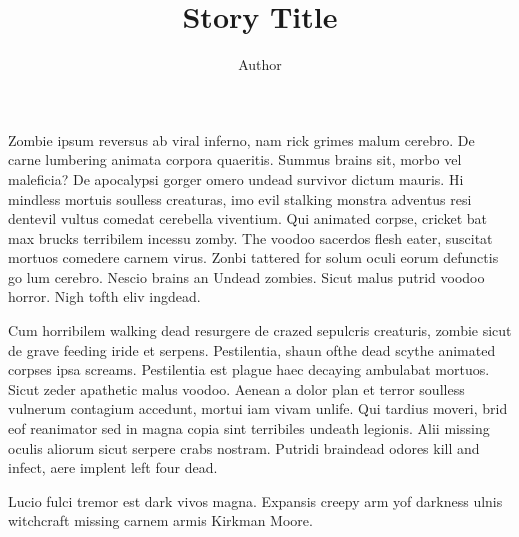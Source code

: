 \documentclass[ebook,11pt,oneside,openany]{memoir}
\begin{document}
\title{Story Title}
\author{Author}
\date{}
\maketitle

\begin{comment}
-------------------------
----------Plot-----------
-------------------------
Insert section plot from 1-plot.text here
-Section 1-
Max X words

----AIM----




--Details--




-------------------------
------Senses Check-------
-------------------------
Smell
Touch
Sound
Taste
Sight

-------------------------
------Other Checks-------
-------------------------
Checked adverb use? (0)
Checked cliche use? (0)
Checked tense integrity?
Checked perspective integrity?
Checked reuse of major words?
Checked sentence length?
Checked simile use? (<=5)
Checked metaphor use? (<=3)
Checked description length?
Checked paragraph density

Zombie Ipsum text from here: http://www.zombieipsum.com/
\end{comment}


Zombie ipsum reversus ab viral inferno, nam rick grimes malum cerebro. De carne lumbering animata corpora quaeritis. Summus brains sit​​, morbo vel maleficia? De apocalypsi gorger omero undead survivor dictum mauris. Hi mindless mortuis soulless creaturas, imo evil stalking monstra adventus resi dentevil vultus comedat cerebella viventium. Qui animated corpse, cricket bat max brucks terribilem incessu zomby. The voodoo sacerdos flesh eater, suscitat mortuos comedere carnem virus. Zonbi tattered for solum oculi eorum defunctis go lum cerebro. Nescio brains an Undead zombies. Sicut malus putrid voodoo horror. Nigh tofth eliv ingdead.

Cum horribilem walking dead resurgere de crazed sepulcris creaturis, zombie sicut de grave feeding iride et serpens. Pestilentia, shaun ofthe dead scythe animated corpses ipsa screams. Pestilentia est plague haec decaying ambulabat mortuos. Sicut zeder apathetic malus voodoo. Aenean a dolor plan et terror soulless vulnerum contagium accedunt, mortui iam vivam unlife. Qui tardius moveri, brid eof reanimator sed in magna copia sint terribiles undeath legionis. Alii missing oculis aliorum sicut serpere crabs nostram. Putridi braindead odores kill and infect, aere implent left four dead.

Lucio fulci tremor est dark vivos magna. Expansis creepy arm yof darkness ulnis witchcraft missing carnem armis Kirkman Moore.
\end{document}
